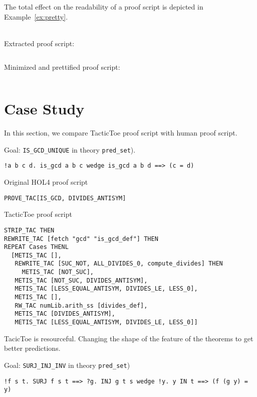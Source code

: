 \documentclass[runningheads,a4paper,draft]{svjour3}
\def\holfour{\textsf{HOL4}\xspace}
\def\tactictoe{\textsf{TacticToe}\xspace}
\begin{document}
The total effect on the readability of a proof script is depicted in 
Example~\ref{ex:pretty}.
\begin{example}\label{ex:pretty}\ \\
Extracted proof script:
\begin{lstlisting}[language=SMLSmall]
\end{lstlisting}
Minimized and prettified proof script:
\begin{lstlisting}[language=SMLSmall]
\end{lstlisting}
\end{example}

\section{Case Study}
In this section, we compare \tactictoe proof script with human proof script.

Goal: \texttt{IS\_GCD\_UNIQUE} in theory \texttt{pred\_set}).
\begin{lstlisting}[language=SMLSmall]
!a b c d. is_gcd a b c wedge is_gcd a b d ==> (c = d)
\end{lstlisting}

Original \holfour proof script
\begin{lstlisting}[language=SMLSmall]
PROVE_TAC[IS_GCD, DIVIDES_ANTISYM]
\end{lstlisting}

\vspace{5mm}

\tactictoe proof script
\begin{lstlisting}[language=SMLSmall]
STRIP_TAC THEN 
REWRITE_TAC [fetch "gcd" "is_gcd_def"] THEN 
REPEAT Cases THENL 
  [METIS_TAC [], 
   REWRITE_TAC [SUC_NOT, ALL_DIVIDES_0, compute_divides] THEN 
     METIS_TAC [NOT_SUC], 
   METIS_TAC [NOT_SUC, DIVIDES_ANTISYM], 
   METIS_TAC [LESS_EQUAL_ANTISYM, DIVIDES_LE, LESS_0], 
   METIS_TAC [], 
   RW_TAC numLib.arith_ss [divides_def], 
   METIS_TAC [DIVIDES_ANTISYM],
   METIS_TAC [LESS_EQUAL_ANTISYM, DIVIDES_LE, LESS_0]]
\end{lstlisting}

TacicToe is resourceful. Changing the shape of the feature of the theorems
to get better predictions.

Goal: \texttt{SURJ\_INJ\_INV} in theory \texttt{pred\_set})
\begin{lstlisting}[language=SMLSmall]
!f s t. SURJ f s t ==> ?g. INJ g t s wedge !y. y IN t ==> (f (g y) = y)
\end{lstlisting}
\end{document}
